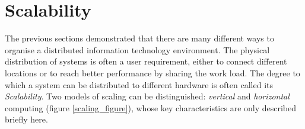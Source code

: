 %
%
%
%
%
%
%

\section{Scalability}
\label{scalability_heading}

The previous sections demonstrated that there are many different ways to organise
a distributed information technology environment. The physical distribution of
systems is often a user requirement, either to connect different locations or to
reach better performance by sharing the work load. The degree to which a system
can be distributed to different hardware is often called its \emph{Scalability}.
Two models of scaling can be distinguished: \emph{vertical} and \emph{horizontal}
computing (figure \ref{scaling_figure}), whose key characteristics are only
described briefly here.

